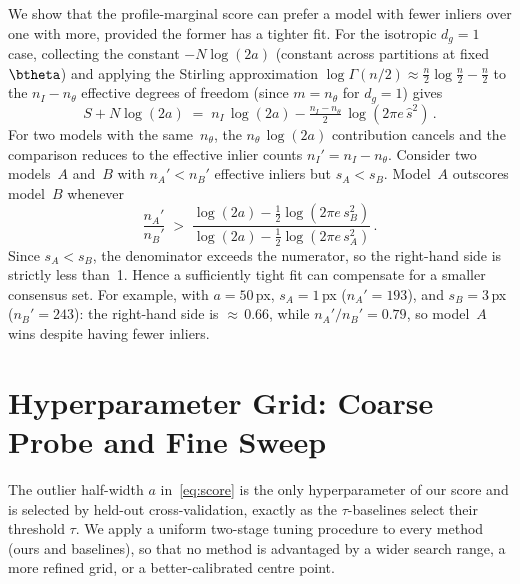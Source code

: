 \documentclass{article}
\begin{document}
	We show that the profile-marginal score can prefer a model with fewer
	inliers over one with more, provided the former has a tighter fit.
	For the isotropic $d_g = 1$ case, collecting the constant
	$-N\log(2a)$ (constant across
	partitions at fixed~$\btheta$) and applying the Stirling
	approximation
	$\log\Gamma(n/2) \approx \tfrac{n}{2}\log\tfrac{n}{2} -
		\tfrac{n}{2}$ to the $n_I{-}n_\theta$ effective degrees of freedom
	(since $m = n_\theta$ for $d_g = 1$)
	gives
	\begin{equation}
		S + N\log(2a)
		\;=\; n_I\,\log(2a)
		- \tfrac{n_I{-}n_\theta}{2}\,\log(2\pi e\,\hat s^2)\,.
		\label{eq:per-inlier}
	\end{equation}
	For two models with the same~$n_\theta$, the
	$n_\theta\,\log(2a)$ contribution cancels and the comparison reduces to
	the effective inlier counts $n_I' = n_I - n_\theta$.
	Consider two models~$A$ and~$B$
	with $n_A' < n_B'$ effective inliers but $s_A < s_B$.
	Model~$A$ outscores model~$B$ whenever
	\begin{equation}
		\frac{n_A'}{n_B'}
		\;>\;
		\frac{\log(2a) - \tfrac{1}{2}\log(2\pi e\,s_B^2)}
		{\log(2a) - \tfrac{1}{2}\log(2\pi e\,s_A^2)}\,.
		\label{eq:quality-vs-size}
	\end{equation}
	Since $s_A < s_B$, the denominator exceeds the numerator, so the
	right-hand side is strictly less than~1.  Hence a sufficiently
	tight fit can compensate for a smaller consensus set.  For example,
	with $a = 50$\,px, $s_A = 1$\,px ($n_A' = 193$), and
	$s_B = 3$\,px ($n_B' = 243$): the right-hand side
	is ${\approx}\,0.66$, while $n_A'/n_B' = 0.79$, so model~$A$ wins
	despite having fewer inliers.

	\section{Hyperparameter Grid: Coarse Probe and Fine Sweep}
	\label{sec:supp-a-grid}

	The outlier half-width $a$ in~\eqref{eq:score} is the only
	hyperparameter of our score and is selected by held-out
	cross-validation, exactly as the $\tau$-baselines select their
	threshold $\tau$.  We apply a uniform two-stage tuning
	procedure to every method (ours and baselines), so that no
	method is advantaged by a wider search range, a more refined
	grid, or a better-calibrated centre point.
\end{document}
